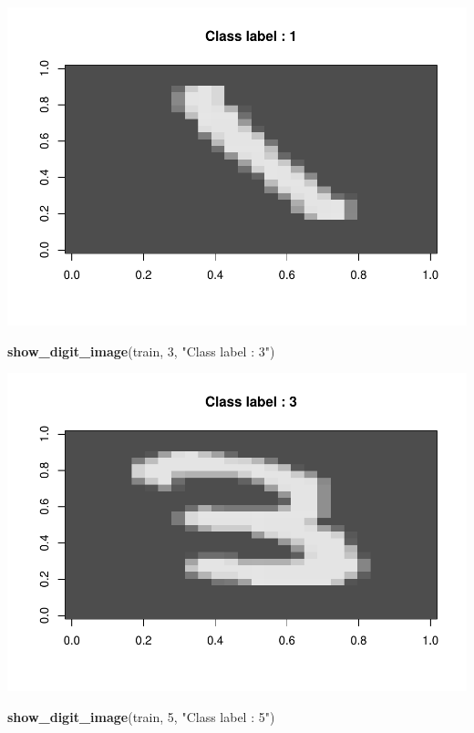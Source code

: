 \documentclass[]{article}
\newenvironment{Shaded}{\begin{snugshade}}{\end{snugshade}}
\newcommand{\KeywordTok}[1]{\textcolor[rgb]{0.13,0.29,0.53}{\textbf{{#1}}}}
\newcommand{\DecValTok}[1]{\textcolor[rgb]{0.00,0.00,0.81}{{#1}}}
\newcommand{\StringTok}[1]{\textcolor[rgb]{0.31,0.60,0.02}{{#1}}}
\newcommand{\NormalTok}[1]{{#1}}
\begin{document}
\includegraphics{hw3_files/figure-latex/unnamed-chunk-7-1.pdf}

\begin{Shaded}
\begin{Highlighting}[]
\KeywordTok{show_digit_image}\NormalTok{(train, }\DecValTok{3}\NormalTok{, }\StringTok{"Class label : 3"}\NormalTok{)}
\end{Highlighting}
\end{Shaded}

\includegraphics{hw3_files/figure-latex/unnamed-chunk-8-1.pdf}

\begin{Shaded}
\begin{Highlighting}[]
\KeywordTok{show_digit_image}\NormalTok{(train, }\DecValTok{5}\NormalTok{, }\StringTok{"Class label : 5"}\NormalTok{)}
\end{Highlighting}
\end{Shaded}
\end{document}
